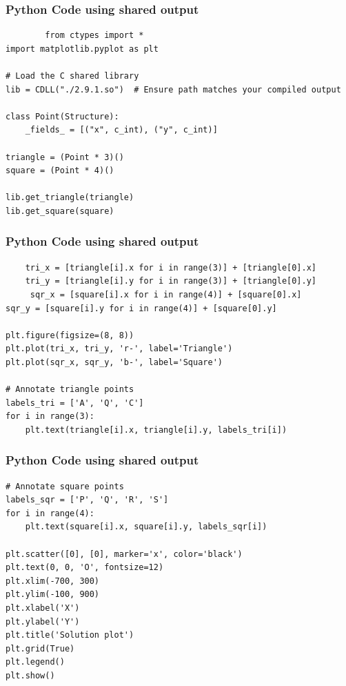 \documentclass{beamer}
\begin{document}
\begin{frame}[fragile]
	\frametitle{Python Code using shared output}
	\begin{lstlisting}
		from ctypes import * 
import matplotlib.pyplot as plt

# Load the C shared library
lib = CDLL("./2.9.1.so")  # Ensure path matches your compiled output

class Point(Structure):
    _fields_ = [("x", c_int), ("y", c_int)]

triangle = (Point * 3)()
square = (Point * 4)()

lib.get_triangle(triangle)
lib.get_square(square)
	\end{lstlisting}
\end{frame}
\begin{frame}[fragile]
	\frametitle{Python Code using shared output}
	\begin{lstlisting}	
    tri_x = [triangle[i].x for i in range(3)] + [triangle[0].x]
    tri_y = [triangle[i].y for i in range(3)] + [triangle[0].y]
     sqr_x = [square[i].x for i in range(4)] + [square[0].x]
sqr_y = [square[i].y for i in range(4)] + [square[0].y]

plt.figure(figsize=(8, 8))
plt.plot(tri_x, tri_y, 'r-', label='Triangle')
plt.plot(sqr_x, sqr_y, 'b-', label='Square')

# Annotate triangle points
labels_tri = ['A', 'Q', 'C']
for i in range(3):
    plt.text(triangle[i].x, triangle[i].y, labels_tri[i])
	\end{lstlisting}
\end{frame}
\begin{frame}[fragile]
	\frametitle{Python Code using shared output}
	\begin{lstlisting}
# Annotate square points
labels_sqr = ['P', 'Q', 'R', 'S']
for i in range(4):
    plt.text(square[i].x, square[i].y, labels_sqr[i])

plt.scatter([0], [0], marker='x', color='black')
plt.text(0, 0, 'O', fontsize=12)
plt.xlim(-700, 300)
plt.ylim(-100, 900)
plt.xlabel('X')
plt.ylabel('Y')
plt.title('Solution plot')
plt.grid(True)
plt.legend()
plt.show()
	\end{lstlisting}
\end{frame}
\end{document}
